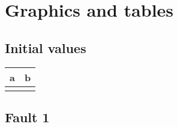 
\appendixtoc
{}
\label{app:appendix}


%  
%
%


\chapter{Graphics and tables}

\section{Initial values}
\label{app:initials}

\begin{centering}
    \small
    \begin{tabularx}{\textwidth}{|X|X|}
        \hline
        \rowcolor{lightgray} a & b \\ \hline \hline
        & \\ \hline
    \end{tabularx}
\end{centering}

\section{Fault 1}
\label{app:fault1}

